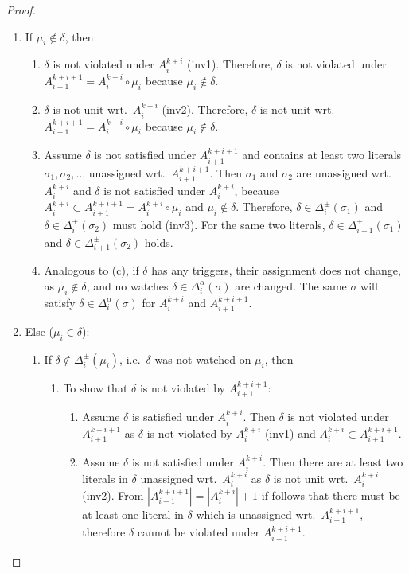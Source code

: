 \documentclass{vutinfth} %
\theoremstyle{example}
\theoremstyle{definition}
\theoremstyle{theorem}
\theoremstyle{lemma}
\theoremstyle{corollary}
\newcommand{\ass}{A}
\newcommand{\fabef}{\ass_{i}}
\newcommand{\faaf}{\ass_{i + 1}}
\newcommand{\abef}{\fabef^{k + i}}
\newcommand{\aaf}{\faaf^{k + i + 1}}
\newcommand{\dbef}{\Delta_{i}}
\newcommand{\daf}{\Delta_{i+1}}
\newcommand{\sgl}{\mu}
\newcommand{\bsgl}{\sigma}
\begin{document}
\begin{proof}
\begin{enumerate}
\item If $\sgl_i \not \in \delta$, then: %
\begin{enumerate}
\item $\delta$ is not violated under $\abef$ (inv1). Therefore, $\delta$ is not violated under $\aaf = \abef \circ \sgl_i$ because $\sgl_i \not \in \delta$.
\item $\delta$ is not unit wrt.~$\abef$ (inv2). Therefore, $\delta$ is not unit wrt.~$\aaf = \abef \circ \sgl_i$ because $\sgl_i \not \in \delta$.
\item Assume $\delta$ is not satisfied under $\aaf$ and contains at least two literals $\bsgl_1, \bsgl_2, \ldots$ unassigned wrt.~$\aaf$. Then $\bsgl_1$ and $\bsgl_2$ are unassigned wrt.~$\abef$ and $\delta$ is not satisfied under $\abef$, because $\abef \subset \aaf = \abef \circ \sgl_i$ and $\sgl_i \not \in \delta$. Therefore, $\delta \in \dbef^\pm(\bsgl_1)$ and $\delta \in \dbef^\pm(\bsgl_2)$ must hold (inv3). For the same two literals, $\delta \in \daf^\pm(\bsgl_1)$ and $\delta \in \daf^\pm(\bsgl_2)$ holds. %
\item Analogous to (c), if $\delta$ has any triggers, their assignment does not change, as $\sgl_i \not \in \delta$, and no watches $\delta \in \dbef^\alpha(\bsgl)$ are changed. The same $\bsgl$ will satisfy $\delta \in \dbef^\alpha(\bsgl)$ for $\abef$ and $\aaf$.
\end{enumerate}
\item Else ($\sgl_i \in \delta$):
\begin{enumerate}
\item If $\delta \not \in \dbef^\pm(\sgl_i)$, i.e.~$\delta$ was not watched on $\sgl_i$, then
\begin{enumerate}
\item To show that $\delta$ is not violated by $\aaf$:
\begin{enumerate}
\item Assume $\delta$ is satisfied under $\abef$. Then $\delta$ is not violated under $\aaf$ as $\delta$ is not violated by $\abef$ (inv1) and $\abef \subset \aaf$.
\item Assume $\delta$ is not satisfied under $\abef$. Then there are at least two literals in $\delta$ unassigned wrt.~$\abef$ as $\delta$ is not unit wrt.~$\abef$ (inv2). From $|\aaf| = |\abef| + 1$ if follows that there must be at least one literal in $\delta$ which is unassigned wrt.~$\aaf$, therefore $\delta$ cannot be violated under $\aaf$.

\end{enumerate}
\end{enumerate}
\end{enumerate}
\end{enumerate}
\end{proof}
\end{document}

